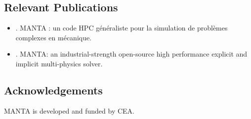 \subsection{Relevant Publications}
\label{sec:MANTA:publications}
\begin{itemize}
   \item {}. MANTA : un code HPC généraliste pour la simulation de problèmes complexes en mécanique.
   \item {}. MANTA: an industrial-strength open-source high performance explicit and implicit multi-physics solver.
\end{itemize}


\subsection{Acknowledgements}
\label{sec::MANTA:acknowledgements}

MANTA is developed and funded by CEA. 


